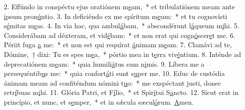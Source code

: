 2. Effúndo in conspéctu ejus oratiónem m\uline{e}am,~* et tribulatiónem meam ante \uline{i}psum pron\uline{ú}ntio.
3. In deficiéndo ex me spíritum m\uline{e}um:~* et tu cognovísti s\uline{é}mitas m\uline{e}as.
4. In via hac, qua ambul\uline{á}bam,~* abscondérunt l\uline{á}queum m\uline{i}hi.
5. Considerábam ad déxteram, et vid\uline{é}bam:~* et non erat qui cogn\uline{ó}scer\uline{e}t me.
6. Périit fuga \uline{a} me:~* et non est qui requírat \uline{á}nimam m\uline{e}am.
7. Clamávi ad te, Dómine,~† dixi: Tu es spes m\uline{e}a,~* pórtio mea in t\uline{e}rra viv\uline{é}ntium.
8. Inténde ad deprecatiónem m\uline{e}am:~* quia humili\uline{á}tus sum n\uline{i}mis.
9. Líbera me a persequéntib\uline{u}s me:~* quia confort\uline{á}ti sunt s\uline{u}per me.
10. Educ de custódia ánimam meam ad confiténdum nómini t\uline{u}o:~* me exspéctant justi, donec retr\uline{í}buas m\uline{i}hi.
11. Glória Patri, et F\uline{í}lio,~* et Spir\uline{í}tui S\uline{a}ncto.
12. Sicut erat in princípio, et nunc, et s\uline{e}mper,~* et in sǽcula sæcul\uline{ó}rum. \uline{A}men.
